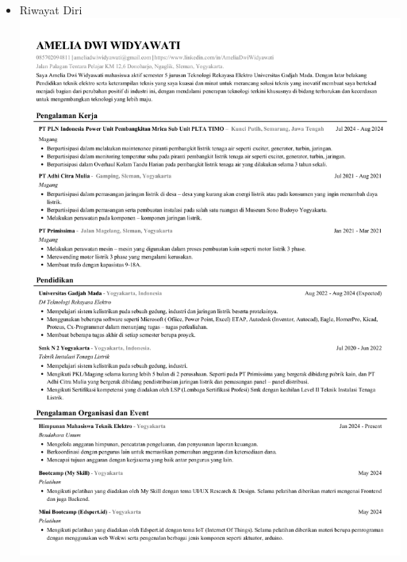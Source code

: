 \begin{itemize}
	
	\item Riwayat Diri \\
	\includegraphics[scale=0.69,page=1]{dokumen/cv_amelia.pdf}
	\newpage

\end{itemize}
